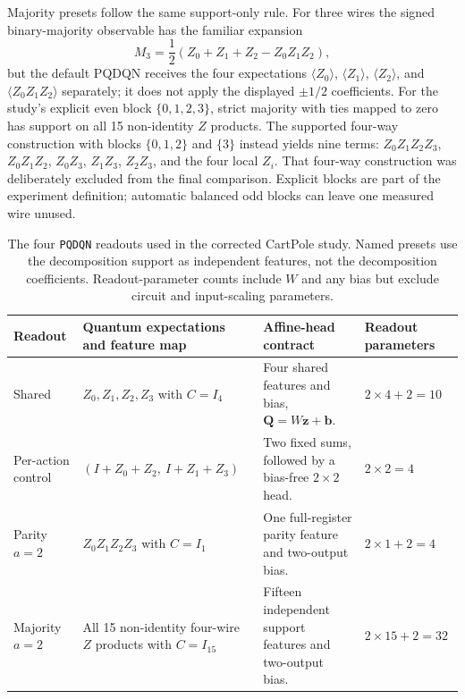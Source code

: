 \documentclass[10pt]{article}
\newcommand{\code}[1]{\texttt{#1}}
\begin{document}
Majority presets follow the same support-only rule.  For three wires the
signed binary-majority observable has the familiar expansion
\begin{equation}
  M_3=\frac{1}{2}\left(
    Z_0+Z_1+Z_2-Z_0Z_1Z_2
  \right),
  \label{eq:pqdqn-majority-three-wire}
\end{equation}
but the default PQDQN receives the four expectations
$\langle Z_0\rangle$, $\langle Z_1\rangle$, $\langle Z_2\rangle$, and
$\langle Z_0Z_1Z_2\rangle$ separately; it does not apply the displayed
$\pm1/2$ coefficients.  For the study's explicit even block
$\{0,1,2,3\}$, strict majority with ties mapped to zero has support on all 15
non-identity $Z$ products.  The supported four-way construction with blocks
$\{0,1,2\}$ and $\{3\}$ instead yields nine terms:
$Z_0Z_1Z_2Z_3$, $Z_0Z_1Z_2$, $Z_0Z_3$, $Z_1Z_3$, $Z_2Z_3$, and the four
local $Z_i$.  That four-way construction was deliberately excluded from the
final comparison.  Explicit blocks are part of the experiment definition;
automatic balanced odd blocks can leave one measured wire unused.

\begin{table}[t]
\centering
\caption{The four \code{PQDQN} readouts used in the corrected CartPole study.
Named presets use the decomposition support as independent features, not the
decomposition coefficients.  Readout-parameter counts include $W$ and any
bias but exclude circuit and input-scaling parameters.}
\label{tab:pqdqn-readouts}
\small
\begin{tabularx}{\textwidth}{@{}p{}p{}X p{}@{}}
\toprule
Readout & Quantum expectations and feature map & Affine-head contract & Readout parameters \\
\midrule
Shared & $Z_0,Z_1,Z_2,Z_3$ with $C=I_4$ & Four shared features and bias, $\bm Q=W\bm z+\bm b$. & $2\times4+2=10$ \\
Per-action control & $(I+Z_0+Z_2,\ I+Z_1+Z_3)$ & Two fixed sums, followed by a bias-free $2\times2$ head. & $2\times2=4$ \\
Parity $a=2$ & $Z_0Z_1Z_2Z_3$ with $C=I_1$ & One full-register parity feature and two-output bias. & $2\times1+2=4$ \\
Majority $a=2$ & All 15 non-identity four-wire $Z$ products with $C=I_{15}$ & Fifteen independent support features and two-output bias. & $2\times15+2=32$ \\
\bottomrule
\end{tabularx}
\end{table}
\end{document}
